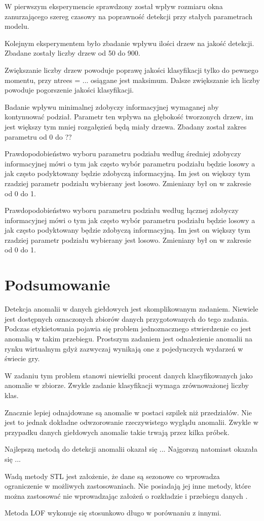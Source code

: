 \documentclass{article}
\begin{document}
W pierwszym eksperymencie sprawdzony został wpływ rozmiaru okna zanurzającego szereg czasowy na poprawność detekcji przy stałych parametrach modelu. 

Kolejnym eksperymentem było zbadanie wpływu ilości drzew na jakość detekcji. Zbadane zostały liczby drzew od 50 do 900. 

Zwiększanie liczby drzew powoduje poprawę jakości klasyfikacji tylko do pewnego momentu, przy ntrees = ... osiągane jest maksimum. Dalsze zwiększanie ich liczby powoduje pogorszenie jakości klasyfikacji.  

Badanie wpływu minimalnej zdobyczy informacyjnej wymaganej aby kontynuować podział. Parametr ten wpływa na głębokość tworzonych drzew, im jest większy tym mniej rozgałęzień będą miały drzewa. Zbadany został zakres parametru od 0 do ?? 

Prawdopodobieństwo wyboru parametru podziału według średniej zdobyczy informacyjnej mówi o tym jak często wybór parametru podziału będzie losowy a jak często podyktowany będzie zdobyczą informacyjną. Im jest on większy tym rzadziej parametr podziału wybierany jest losowo. Zmieniany był on w zakresie od 0 do 1.

Prawdopodobieństwo wyboru parametru podziału według łącznej zdobyczy informacyjnej mówi o tym jak często wybór parametru podziału będzie losowy a jak często podyktowany będzie zdobyczą informacyjną. Im jest on większy tym rzadziej parametr podziału wybierany jest losowo. Zmieniany był on w zakresie od 0 do 1.

\section{Podsumowanie}
Detekcja anomalii w danych giełdowych jest skomplikowanym zadaniem. Niewiele jest dostępnych oznaczonych zbiorów danych przygotowanych do tego zadania. Podczas etykietowania pojawia się problem jednoznacznego stwierdzenie co jest anomalią w takim przebiegu. Prostszym zadaniem jest odnalezienie anomalii na rynku wirtualnym gdyż zazwyczaj wynikają one z pojedynczych wydarzeń w świecie gry.  

W zadaniu tym problem stanowi niewielki procent danych klasyfikowanych jako anomalie w zbiorze. Zwykle zadanie klasyfikacji wymaga zrównoważonej liczby klas.  

Znacznie lepiej odnajdowane są anomalie w postaci szpilek niż przedziałów. Nie jest to jednak dokładne odwzorowanie rzeczywistego wyglądu anomalii. Zwykle w przypadku danych giełdowych anomalie takie trwają przez kilka próbek. 

Najlepszą metodą do detekcji anomalii okazał się ... 
Najgorszą natomiast okazała się ...

Wadą metody STL jest założenie, że dane są sezonowe co wprowadza ograniczenie w możliwych zastosowaniach. Nie posiadają jej inne metody, które można zastosować nie wprowadzając założeń o rozkładzie i przebiegu danych . 

Metoda LOF wykonuje się stosunkowo długo w porównaniu z innymi.
 

\end{document}
